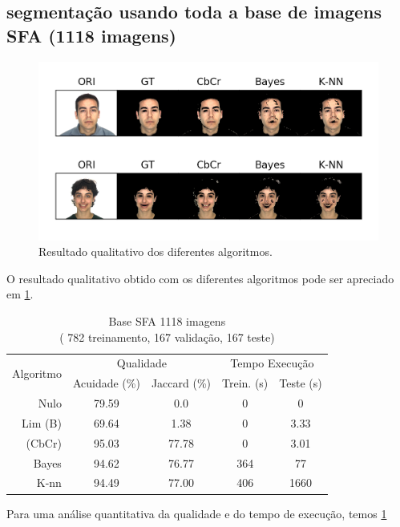 \documentclass[conference]{IEEEtran}
\begin{document}
\subsection{segmentação usando toda a base de imagens SFA (1118 imagens)}

\begin{figure}[ht!]
\label{sfa1118}
\begin{center}
\includegraphics[width=\columnwidth]{sfa1118.png}
\caption{Resultado qualitativo dos diferentes algoritmos.}
\end{center}
\end{figure}
O resultado qualitativo obtido com os diferentes algoritmos pode ser apreciado em \ref{sfa1118}.

\begin{table}[]
\centering
\caption{Base SFA 1118 imagens\\ ( 782 treinamento, 167 validação, 167 teste)}
\label{table_sfa1118}
\begin{tabular}{|r|c|c|c|c|}
\hline
\multicolumn{1}{|c|}{\multirow{2}{*}{Algoritmo}} & \multicolumn{2}{c|}{Qualidade} & \multicolumn{2}{c|}{Tempo Execução} \\ \cline{2-5} 
\multicolumn{1}{|c|}{} & Acuidade (\%) & Jaccard (\%) & Trein. (s) & Teste (s) \\ \hline
Nulo & 79.59 & 0.0 & 0 & 0 \\ \hline
Lim (B) & 69.64 & 1.38 & 0 & 3.33\\ \hline
(CbCr) & 95.03 & 77.78 & 0 & 3.01 \\ \hline
Bayes & 94.62 & 76.77 & 364 & 77 \\ \hline
K-nn & 94.49 & 77.00 & 406 & 1660 \\ \hline
\end{tabular}
\end{table}
Para uma análise quantitativa da qualidade e do tempo de execução, temos \ref{table_sfa1118}
\end{document}
